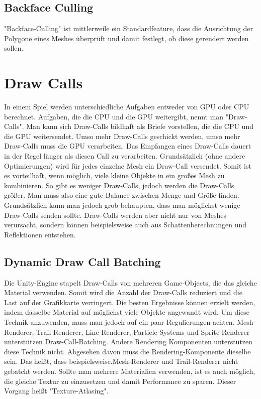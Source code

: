 \subsection{Backface Culling}
"Backface-Culling" ist mittlerweile ein Standardfeature, dass die Ausrichtung der Polygone eines Meshes überprüft und damit festlegt, ob diese gerendert werden sollen.
\cite{_cryengine_culling}

\section{Draw Calls}
In einem Spiel werden unterschiedliche Aufgaben entweder von GPU oder CPU berechnet.
Aufgaben, die die CPU und die GPU weitergibt, nennt man "Draw-Calls". Man kann sich Draw-Calls bildhaft als Briefe vorstellen, die die CPU und die GPU weitersendet. Umso mehr Draw-Calls geschickt werden, umso mehr Draw-Calls muss die GPU verarbeiten. Das Empfangen eines Draw-Calls dauert in der Regel länger als diesen Call zu verarbeiten. Grundsätzlich (ohne andere Optimierungen) wird für jedes einzelne Mesh ein Draw-Call versendet. Somit ist es vorteilhaft, wenn möglich, viele kleine Objekte in ein großes Mesh zu kombinieren. So gibt es weniger Draw-Calls, jedoch werden die Draw-Calls größer. Man muss also eine gute Balance zwischen Menge und Größe finden. Grundsätzlich kann man jedoch grob behaupten, dass man möglichst wenige Draw-Calls senden sollte. Draw-Calls werden aber nicht nur von Meshes verursacht, sondern können beispielsweise auch aus Schattenberechnungen und Reflektionen entstehen.
\cite{_drawcallbatching}

\subsection{Dynamic Draw Call Batching}
Die Unity-Engine stapelt Draw-Calls von mehreren Game-Objects, die das gleiche Material verwenden. Somit wird die Anzahl der Draw-Calls reduziert und die Last auf der Grafikkarte verringert. Die besten Ergebnisse können erzielt werden, indem dasselbe Material auf möglichst viele Objekte angewandt wird. Um diese Technik anzuwenden, muss man jedoch auf ein paar Regulierungen achten. Mesh-Renderer, Trail-Renderer, Line-Renderer, Particle-Systems und Sprite-Renderer unterstützen Draw-Call-Batching. Andere Rendering Komponenten unterstützen diese Technik nicht. Abgesehen davon muss die Rendering-Komponente dieselbe sein. Das heißt, dass beispielsweise.Mesh-Renderer und Trail-Renderer nicht gebatcht werden. Sollte man mehrere Materialien verwenden, ist es auch möglich, die gleiche Textur zu einzusetzen und damit Performance zu sparen. Dieser Vorgang heißt "Texture-Atlasing".
\cite{_drawcallbatching}

